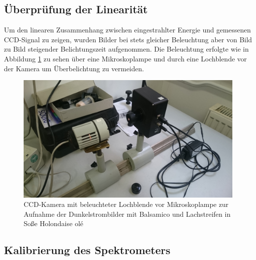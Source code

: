 	\subsection{Überprüfung der Linearität} %
	\label{sub:_berpr_fung_der_linearit_t}
	
		Um den linearen Zusammenhang zwischen eingestrahlter Energie und gemessenen CCD-Signal zu zeigen, wurden Bilder bei stets gleicher Beleuchtung aber von Bild zu Bild steigender Belichtungszeit aufgenommen.
		Die Beleuchtung erfolgte wie in Abbildung \ref{mikrolampe} zu sehen über eine Mikroskoplampe und durch eine Lochblende vor der Kamera um Überbelichtung zu vermeiden.

		\begin{figure}
			\center
			\includegraphics[scale=0.085]{messwerte/Handybilder/DSC_0671.JPG}
			\caption{CCD-Kamera mit beleuchteter Lochblende vor Mikroskoplampe zur Aufnahme der Dunkelstrombilder mit Balsamico und Lachstreifen in Soße Holondaise olé}
			\label{mikrolampe}
		\end{figure}



	\subsection{Kalibrierung des Spektrometers} %
	\label{sub:kalibrierung_des_spektrometers}
	

